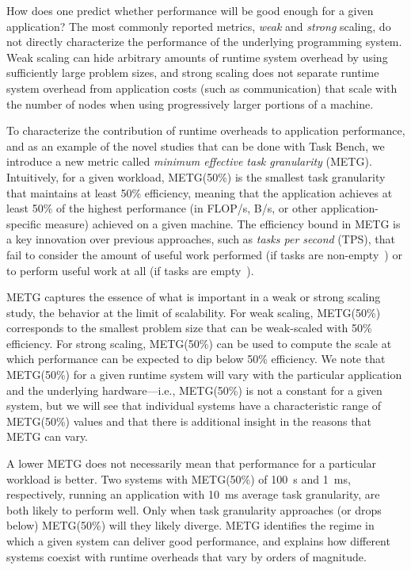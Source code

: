 How does one predict whether performance will be good enough for a given application?
The most commonly reported metrics,
\emph{weak} and \emph{strong} scaling, do not directly characterize
the performance of the underlying
programming system. Weak scaling can hide arbitrary amounts of runtime
system overhead by using sufficiently large problem sizes, and strong
scaling does not separate runtime system overhead from application costs
(such as communication) that scale with the number of nodes when
using progressively larger portions of a machine. 

To characterize the contribution of runtime overheads
to application performance, and as an example of the novel studies that can be done
with Task Bench, we introduce a new metric called
\emph{minimum effective task granularity} (METG). Intuitively, for a given
workload, METG(50\%) is the smallest task granularity that maintains
at least 50\% efficiency, meaning that the application achieves at
least 50\% of the highest performance (in FLOP/s, B/s, or other
application-specific measure) achieved on a given
machine. The efficiency bound in METG is a key innovation over
previous approaches, such as \emph{tasks per second} (TPS), that fail
to consider the amount of useful work performed (if tasks are
non-empty~\cite{Canary16, Armstrong14}) or to perform useful work at all (if tasks are empty~\cite{LegionTracing18}).

METG captures the essence of what is important in a
weak or strong scaling study, the behavior at the limit of
scalability. For weak scaling, METG(50\%) corresponds to the
smallest problem size that can be weak-scaled with 50\%
efficiency. For strong scaling, METG(50\%) can be used to compute the
scale at which performance can be expected to dip below 50\%
efficiency.  We note that METG(50\%) for a given runtime system will
vary with the particular application and the underlying hardware---i.e., METG(50\%)
is not a constant for a given system, but we will see that individual systems have
a characteristic range of METG(50\%) values and that there is additional insight
in the reasons that METG can vary.

A lower METG does not necessarily mean that
performance for a particular workload is better. Two systems with METG(50\%) of 100~\textmu{}s and 1~ms,
respectively, running an application with 10~ms average task granularity, are both likely to perform well. Only when task
granularity approaches (or drops below) METG(50\%) will they
likely diverge. METG identifies the regime in which a
given system can deliver good performance, and explains how
different systems coexist with runtime overheads that vary by orders of magnitude.

